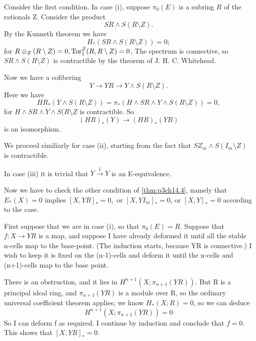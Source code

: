 \documentclass[../main]{subfiles}
\begin{document}
Consider the first condition. In case (i), suppose $\pi_{0}(E)$ is a subring $R$ of the rationals Z. Consider the product 
 $$
  SR \wedge S(R\setminus Z).
$$ 
By the Kunneth theorem we have 
$$
  H_{\ast}(SR \wedge S(R \setminus Z)) =0; 
$$ 
for $R \otimes_{Z} (R\setminus Z)=0, \mathop{\mathrm{  Tor}}^Z_{1}(R, R \setminus Z)=0$, The spectrum is connective, so $SR \wedge S(R \setminus Z)$ is contractible by the theorem of J. H. C. Whitehead. 

Now we have a cofibering 
$$
  Y \to YR \to Y \wedge S ( R \setminus Z).
$$ 
Here we have 
$$
  HR_{\ast}(Y \wedge S (R \setminus Z)) = \pi_{\ast}(H \wedge SR \wedge Y \wedge S(R \setminus Z))=0, 
$$ 
for $H \wedge SR \wedge Y \wedge S(R \setminus Z$ is contractible. So
$$
(HR)_{\ast}(Y) \to (HR)_{\ast}(YR)
$$ 
is an isomorphism. 

We proceed similiarly for case (ii), starting from the fact that $SZ_{m} \wedge S ( I_{m} \setminus Z)$ is contractible. 

In case (iii) it is trivial that $Y \xrightarrow{1} Y $ is an E-equivalence.

Now we have to check the other condition of \ref{thm:p3ch14.4}, namely that $E_{\ast}(X)=0$ implies $\left[X,YR\right]_{\ast}=0,$ or $\left[X,YI_{m}\right]_{\ast}=0$, or $\left[X,Y\right]_{\ast}=0$ according to the case.

First suppose that we are in case (i), so that $\pi_{0}(E)=R$. Suppose that $f\colon  X \to  YR $ is a map, and suppose I have already deformed it until all the stable n-cells map to the base-point. (The induction starts, because YR is connective.) I wish to keep it is fixed on the (n-1)-cells and deform it until the n-cells and (n+1)-cells map to the base point.

There is an obstruction, and it lies in $H^{n+1}(X;\pi_{n+1}(YR))$. But R is a principal ideal ring, and $\pi_{n+1}(YR)$ is a module over R, so the ordinary universal coefficient theorem applies; we know $H_{\ast}(X;R)=0$, so we can deduce 
$$
H^{n+1}(X;\pi_{n+1}(YR))=0
$$ 
So I can deform f as required. I continue by induction and conclude that $f=0.$ This shows that  $\left[X,YR\right]_{\ast}=0$.
\end{document}
